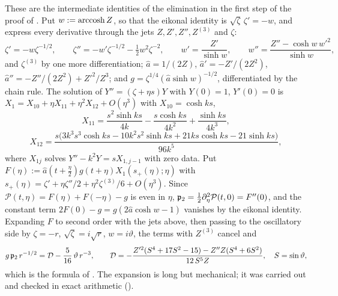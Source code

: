 These are the intermediate identities of the elimination in the first step of the proof of
. Put $w:=\operatorname{arccosh} Z$, so that the eikonal identity is $\sqrt\zeta\,\zeta'=-w$, and express every
derivative through the jets $Z,Z',Z'',Z^{(3)}$ and $\zeta$:
\[
  \zeta'=-w\zeta^{-1/2},\qquad \zeta''=-w'\zeta^{-1/2}-\tfrac12w^2\zeta^{-2},\qquad
  w'=\frac{Z'}{\sinh w},\qquad w''=\frac{Z''-\cosh w\,w'^2}{\sinh w},
\]
and $\zeta^{(3)}$ by one more differentiation; $\hat a=1/(2Z)$, $\hat a'=-Z'/(2Z^2)$,
$\hat a''=-Z''/(2Z^2)+Z'^2/Z^3$; and $g=\zeta^{1/4}(\hat a\sinh w)^{-1/2}$, differentiated by the chain rule.
The solution of $Y''=(\zeta+\eta s)Y$ with $Y(0)=1$, $Y'(0)=0$ is $X_1=X_{10}+\eta X_{11}+\eta^2X_{12}+O(\eta^3)$ with
$X_{10}=\cosh ks$,
\[
  X_{11}=\frac{s^2\sinh ks}{4k}-\frac{s\cosh ks}{4k^2}+\frac{\sinh ks}{4k^3},
\]
\[
  X_{12}=\frac{s\bigl(3k^3s^3\cosh ks-10k^2s^2\sinh ks+21ks\cosh ks-21\sinh ks\bigr)}{96k^5},
\]
where $X_{1j}$ solves $Y''-k^2Y=sX_{1,j-1}$ with zero data. Put
$F(\eta):=\hat a(t+\frac\eta2)g(t+\eta)X_1(s_+(\eta);\eta)$ with $s_+(\eta)=\zeta'+\eta\zeta''/2+\eta^2\zeta^{(3)}/6+O(\eta^3)$.
Since $\mathcal P(t,\eta)=F(\eta)+F(-\eta)-g$ is even in $\eta$, $\mathfrak{p}_2=\frac12\partial_\eta^2\mathcal P(t,0)=F''(0)$, and the
constant term $2F(0)-g=g(2\hat a\cosh w-1)$ vanishes by the eikonal identity. Expanding $F$ to second order
with the jets above, then passing to the oscillatory side by $\zeta=-r$, $\sqrt\zeta=i\sqrt r$, $w=i\vartheta$,
the terms with $Z^{(3)}$ cancel and
\[
  g\,\mathfrak{p}_2\,r^{-1/2}=\mathcal D-\frac5{16}\,\vartheta\,r^{-3},\qquad
  \mathcal D=-\frac{Z'^2(S^4+17S^2-15)-Z''Z(S^4+6S^2)}{12\,S^5Z},\quad S=\sin\vartheta,
\]
which is the formula of . The expansion is long but mechanical; it was carried out and
checked in exact arithmetic ().

